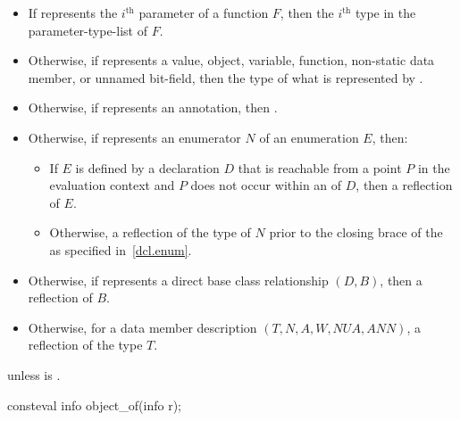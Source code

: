 \begin{itemdescr}
\pnum
\returns
\begin{itemize}
\item
  If  represents the $i^\text{th}$ parameter of a function $F$,
  then the $i^\text{th}$ type
  in the parameter-type-list of $F$.
\item
  Otherwise, if  represents a
  value,
  object,
  variable,
  function,
  non-static data member, or
  unnamed bit-field,
  then the type of what is represented by .
\item
  Otherwise, if  represents an annotation,
  then .
\item
  Otherwise, if  represents
  an enumerator $N$ of an enumeration $E$, then:
  \begin{itemize}
  \item
    If $E$ is defined by a declaration $D$
    that is reachable from a point $P$ in the evaluation context
    and $P$ does not occur within an  of $D$,
    then a reflection of $E$.
  \item
    Otherwise, a reflection of the type of $N$
    prior to the closing brace of the 
    as specified in~\ref{dcl.enum}.
  \end{itemize}
\item
  Otherwise, if  represents
  a direct base class relationship $(D, B)$,
  then a reflection of $B$.
\item
  Otherwise, for a data member description $(T, N, A, W, \mathit{NUA}, \mathit{ANN})$,
  a reflection of the type $T$.
\end{itemize}

\pnum
\throws
{} unless
 is .
\end{itemdescr}

%
\begin{itemdecl}
consteval info object_of(info r);
\end{itemdecl}

